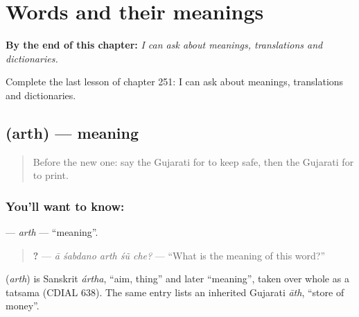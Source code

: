 
\chapter{Words and their meanings}
\label{ch:gu-words-and-their-meanings}

\begin{chapteropening}
\textbf{By the end of this chapter:} \emph{I can ask about meanings, translations and dictionaries.}

Complete the last lesson of chapter 251: I can ask about meanings, translations and dictionaries.
\end{chapteropening}

\section[\texorpdfstring{\gu{અર્થ} (arth)}{અર્થ (arth)}]{ (arth) — meaning}

\label{lesson:GU-C251-arth}



\begin{quote}
Before the new one: say the Gujarati for to keep safe, then the Gujarati for to print.
\end{quote}

\subsection*{You'll want to know: }
\textbf{} — \emph{arth} — \textquotedblleft{}meaning\textquotedblright{}.

\begin{quote}
\textbf{    ?} — \emph{ā śabdano arth śũ che?} — \textquotedblleft{}What is the meaning of this word?\textquotedblright{}
\end{quote}

\begin{cousinweb}
\textbf{} (\emph{arth}) is Sanskrit \emph{ártha}, \textquotedblleft{}aim, thing\textquotedblright{} and later \textquotedblleft{}meaning\textquotedblright{}, taken over whole as a tatsama (CDIAL 638). The same entry lists an inherited Gujarati \emph{āth}, \textquotedblleft{}store of money\textquotedblright{}.
\end{cousinweb}

